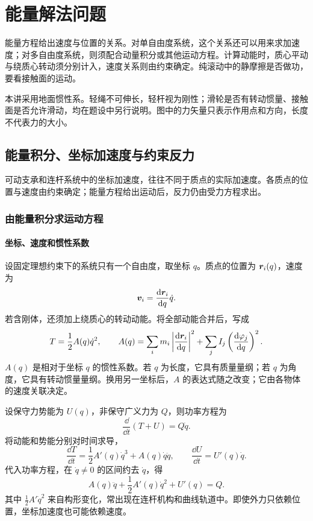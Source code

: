 \chapter{能量解法问题}


能量方程给出速度与位置的关系。对单自由度系统，这个关系还可以用来求加速度；对多自由度系统，则须配合动量积分或其他运动方程。计算动能时，质心平动与绕质心转动须分别计入，速度关系则由约束确定。纯滚动中的静摩擦是否做功，要看接触面的运动。

本讲采用地面惯性系。轻绳不可伸长，轻杆视为刚性；滑轮是否有转动惯量、接触面是否允许滑动，均在题设中另行说明。图中的力矢量只表示作用点和方向，长度不代表力的大小。



\section{能量积分、坐标加速度与约束反力}

可动支承和连杆系统中的坐标加速度，往往不同于质点的实际加速度。各质点的位置与速度由约束确定；能量方程给出运动后，反力仍由受力方程求出。



\subsection{由能量积分求运动方程}
\subsubsection{坐标、速度和惯性系数}
设固定理想约束下的系统只有一个自由度，取坐标 $q$。质点的位置为 $\bm{r}_i(q)$，速度为
\[
\bm{v}_i=\frac{\mathop{}\!\mathrm d\bm{r}_i}{\mathop{}\!\mathrm d q}\dot q.
\]
若含刚体，还须加上绕质心的转动动能。将全部动能合并后，写成
\begin{equation}\label{sup1:eq:d1-A}
T=\frac12 A(q)\dot q^2,\qquad
A(q)=\sum_i m_i\left|\frac{\mathop{}\!\mathrm d\bm{r}_i}{\mathop{}\!\mathrm d q}\right|^2
+\sum_j I_j\left(\frac{\mathop{}\!\mathrm d\varphi_j}{\mathop{}\!\mathrm d q}\right)^2.
\end{equation}
$A(q)$ 是相对于坐标 $q$ 的惯性系数。若 $q$ 为长度，它具有质量量纲；若 $q$ 为角度，它具有转动惯量量纲。换用另一坐标后，$A$ 的表达式随之改变；它由各物体的速度关联决定。

设保守力势能为 $U(q)$，非保守广义力为 $Q$，则功率方程为
\[
\frac{\dd}{\dd t}(T+U)=Q\dot q.
\]
将动能和势能分别对时间求导，
\[
\frac{\dd T}{\dd t}=\frac12A'(q)\dot q^3+A(q)\dot q\ddot q,
\qquad \frac{\dd U}{\dd t}=U'(q)\dot q.
\]
代入功率方程，在 $\dot q\ne0$ 的区间约去 $\dot q$，得
\begin{equation}\label{sup1:eq:d1-one}
A(q)\ddot q+\frac12 A'(q)\dot q^2+U'(q)=Q.
\end{equation}
其中 $\tfrac12A'\dot q^2$ 来自构形变化，常出现在连杆机构和曲线轨道中。即使外力只依赖位置，坐标加速度也可能依赖速度。

